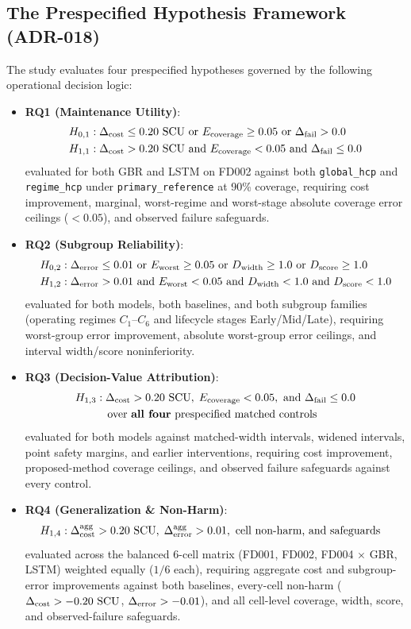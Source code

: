 \subsection{The Prespecified Hypothesis Framework (ADR-018)}
The study evaluates four prespecified hypotheses governed by the following operational decision logic:
\begin{itemize}
  \item \textbf{RQ1 (Maintenance Utility)}:
    \begin{align*}
      H_{0,1}&: \Delta_{\text{cost}} \le 0.20~\text{SCU} \text{ or } E_{\text{coverage}} \ge 0.05 \text{ or } \Delta_{\text{fail}} > 0.0 \\
      H_{1,1}&: \Delta_{\text{cost}} > 0.20~\text{SCU} \text{ and } E_{\text{coverage}} < 0.05 \text{ and } \Delta_{\text{fail}} \le 0.0
    \end{align*}
    evaluated for both GBR and LSTM on FD002 against both \texttt{global\_hcp} and \texttt{regime\_hcp} under \texttt{primary\_reference} at 90\% coverage, requiring cost improvement, marginal, worst-regime and worst-stage absolute coverage error ceilings ($< 0.05$), and observed failure safeguards.
  \item \textbf{RQ2 (Subgroup Reliability)}:
    \begin{align*}
      H_{0,2}&: \Delta_{\text{error}} \le 0.01 \text{ or } E_{\text{worst}} \ge 0.05 \text{ or } D_{\text{width}} \ge 1.0 \text{ or } D_{\text{score}} \ge 1.0 \\
      H_{1,2}&: \Delta_{\text{error}} > 0.01 \text{ and } E_{\text{worst}} < 0.05 \text{ and } D_{\text{width}} < 1.0 \text{ and } D_{\text{score}} < 1.0
    \end{align*}
    evaluated for both models, both baselines, and both subgroup families (operating regimes $C_1$--$C_6$ and lifecycle stages Early/Mid/Late), requiring worst-group error improvement, absolute worst-group error ceilings, and interval width/score noninferiority.
  \item \textbf{RQ3 (Decision-Value Attribution)}:
    \begin{align*}
      H_{1,3}&: \Delta_{\text{cost}} > 0.20~\text{SCU}, \; E_{\text{coverage}} < 0.05, \text{ and } \Delta_{\text{fail}} \le 0.0 \\
      &\quad \text{over \textbf{all four} prespecified matched controls}
    \end{align*}
    evaluated for both models against matched-width intervals, widened intervals, point safety margins, and earlier interventions, requiring cost improvement, proposed-method coverage ceilings, and observed failure safeguards against every control.
  \item \textbf{RQ4 (Generalization \& Non-Harm)}:
    \begin{align*}
      H_{1,4}&: \Delta_{\text{cost}}^{\text{agg}} > 0.20~\text{SCU}, \; \Delta_{\text{error}}^{\text{agg}} > 0.01, \text{ cell non-harm, and safeguards}
    \end{align*}
    evaluated across the balanced 6-cell matrix (FD001, FD002, FD004 $\times$ GBR, LSTM) weighted equally ($1/6$ each), requiring aggregate cost and subgroup-error improvements against both baselines, every-cell non-harm ($\Delta_{\text{cost}} > -0.20~\text{SCU}$, $\Delta_{\text{error}} > -0.01$), and all cell-level coverage, width, score, and observed-failure safeguards.
\end{itemize}
